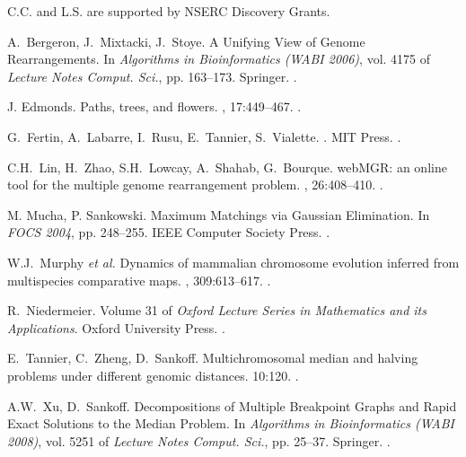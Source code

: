 \documentclass[10pt]{llncs}
\begin{document}
C.C. and L.S. are supported by NSERC Discovery Grants.



\begin{thebibliography}{10} \label{bibliography}

  A.~Bergeron, J.~Mixtacki, J.~Stoye.
  \newblock A Unifying View of Genome Rearrangements.
  \newblock In {\em Algorithms in Bioinformatics (WABI 2006)}, vol. 4175 of {\em Lecture Notes Comput. Sci.}, pp. 163--173.
  \newblock Springer.
  .

  J. Edmonds.
  \newblock Paths, trees, and flowers.
  , 17:449--467.
  .

  G.~Fertin, A.~Labarre, I.~Rusu, E.~Tannier, S.~Vialette.
  .
  \newblock MIT Press.
  . 
  
  C.H.~Lin, H.~Zhao, S.H.~Lowcay, A.~Shahab, G.~Bourque.
  \newblock webMGR: an online tool for the multiple genome rearrangement problem.
  , 26:408--410.
  .
    
  M. Mucha, P. Sankowski.
  \newblock Maximum Matchings via Gaussian Elimination.
  \newblock In {\em FOCS 2004}, pp. 248--255.
  \newblock IEEE Computer Society Press.
  .
  
  W.J.~Murphy {\em et al.}
  \newblock Dynamics of mammalian chromosome evolution inferred from multispecies comparative maps.
  , 309:613--617. 
  .

  R.~Niedermeier.
  \newblock Volume 31 of {\em Oxford Lecture Series in Mathematics and its Applications}.
  \newblock Oxford University Press.
  .



  E.~Tannier, C.~Zheng, D.~Sankoff.
  \newblock Multichromosomal median and halving problems under different genomic distances.
   10:120. 
  .

  A.W.~Xu, D.~Sankoff.
  \newblock Decompositions of Multiple Breakpoint Graphs and Rapid Exact Solutions to the Median Problem.
  \newblock In {\em Algorithms in Bioinformatics (WABI 2008)}, vol. 5251 of {\em Lecture Notes Comput. Sci.}, pp. 25--37.
  \newblock Springer.
  .


\end{thebibliography}
\end{document}
